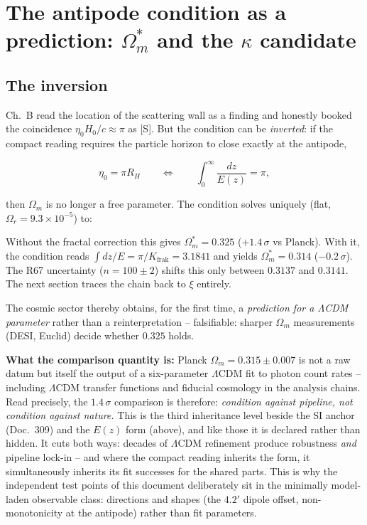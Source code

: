 \documentclass[11pt]{report}
\begin{document}
\chapter{The antipode condition as a prediction:
$\Omega_m^{*}$ and the $\kappa$ candidate}

\section{The inversion}

Ch.~B read the location of the scattering wall as a finding and
honestly booked the coincidence $\eta_0 H_0/c \approx \pi$ as
[S]. But the condition can be \emph{inverted}: if the compact
reading requires the particle horizon to close exactly at the
antipode,

\begin{equation}
  \eta_0 = \pi R_H
  \qquad\Longleftrightarrow\qquad
  \int_0^\infty \frac{dz}{E(z)} = \pi,
\end{equation}

then $\Omega_m$ is no longer a free parameter. The condition
solves uniquely (flat, $\Omega_r = 9.3\times10^{-5}$) to:

Without the fractal correction this gives
$\Omega_m^{*} = 0.325$ ($+1.4\,\sigma$ vs Planck). With it, the
condition reads $\int dz/E = \pi/K_\text{frak} = 3.1841$ and
yields $\Omega_m^{*} = 0.314$ ($-0.2\,\sigma$). The R67
uncertainty ($n = 100\pm2$) shifts this only between $0.3137$ and
$0.3141$. The next section traces the chain back to $\xi$
entirely.

The cosmic sector thereby obtains, for the first time, a
\emph{prediction for a $\Lambda$CDM parameter} rather than a
reinterpretation -- falsifiable: sharper $\Omega_m$ measurements
(DESI, Euclid) decide whether $0.325$ holds.

\textbf{What the comparison quantity is:} Planck
$\Omega_m = 0.315 \pm 0.007$ is not a raw datum but itself the
output of a six-parameter $\Lambda$CDM fit to photon count rates
-- including $\Lambda$CDM transfer functions and fiducial
cosmology in the analysis chains. Read precisely, the
$1.4\,\sigma$ comparison is therefore: \emph{condition against
pipeline, not condition against nature.} This is the third
inheritance level beside the SI anchor (Doc.~309) and the $E(z)$
form (above), and like those it is declared rather than hidden.
It cuts both ways: decades of $\Lambda$CDM refinement produce
robustness \emph{and} pipeline lock-in -- and where the compact
reading inherits the form, it simultaneously inherits its fit
successes for the shared parts. This is why the independent test
points of this document deliberately sit in the minimally
model-laden observable class: directions and shapes (the $4.2'$
dipole offset, non-monotonicity at the antipode) rather than fit
parameters.
\end{document}
